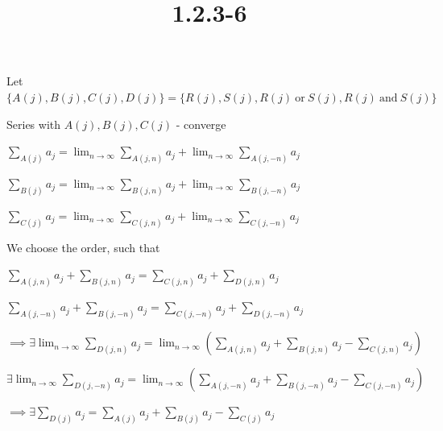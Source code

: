 \documentclass{article}
\title{1.2.3-6}
\begin{document}
\maketitle

Let \( \{ A(j), B(j), C(j), D(j) \} = \{ R(j), S(j), R(j)\ \textrm{or}\ S(j), R(j)\ \textrm{and}\ S(j) \} \)

Series with \( A(j), B(j), C(j) \) - converge

\( \sum_{A(j)} a_j = \lim_{n\to\infty} \sum_{A(j,n)} a_j + \lim_{n\to\infty} \sum_{A(j,-n)} a_j \)

\( \sum_{B(j)} a_j = \lim_{n\to\infty} \sum_{B(j,n)} a_j + \lim_{n\to\infty} \sum_{B(j,-n)} a_j \)

\( \sum_{C(j)} a_j = \lim_{n\to\infty} \sum_{C(j,n)} a_j + \lim_{n\to\infty} \sum_{C(j,-n)} a_j \)

We choose the order, such that

\( \sum_{A(j,n)} a_j + \sum_{B(j,n)} a_j = \sum_{C(j,n)} a_j + \sum_{D(j,n)} a_j \)

\( \sum_{A(j,-n)} a_j + \sum_{B(j,-n)} a_j = \sum_{C(j,-n)} a_j + \sum_{D(j,-n)} a_j \)

\( \implies \exists \lim_{n\to\infty} \sum_{D(j,n)} a_j = \lim_{n\to\infty}(\sum_{A(j,n)} a_j + \sum_{B(j,n)} a_j - \sum_{C(j,n)} a_j) \)

\( \exists \lim_{n\to\infty} \sum_{D(j,-n)} a_j = \lim_{n\to\infty}(\sum_{A(j,-n)} a_j + \sum_{B(j,-n)} a_j - \sum_{C(j,-n)} a_j) \)

\( \implies \exists \sum_{D(j)} a_j = \sum_{A(j)} a_j + \sum_{B(j)} a_j - \sum_{C(j)} a_j \)
\end{document}
